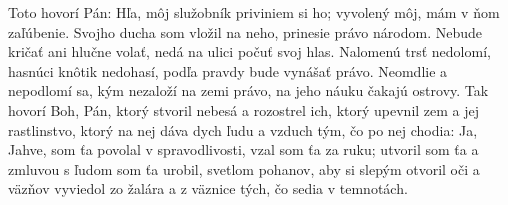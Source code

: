 Toto hovorí Pán: 
Hľa, môj služobník priviniem si ho;
vyvolený môj, mám v ňom zaľúbenie.
Svojho ducha som vložil na neho,
prinesie právo národom.
Nebude kričať ani hlučne volať,
nedá na ulici počuť svoj hlas.
Nalomenú trsť nedolomí,
hasnúci knôtik nedohasí,
podľa pravdy bude vynášať právo.
Neomdlie a nepodlomí sa,
kým nezaloží na zemi právo,
na jeho náuku čakajú ostrovy.
Tak hovorí Boh, Pán,
ktorý stvoril nebesá a rozostrel ich,
ktorý upevnil zem a jej rastlinstvo,
ktorý na nej dáva dych ľudu
a vzduch tým, čo po nej chodia:
Ja, Jahve, som ťa povolal v spravodlivosti,
vzal som ťa za ruku;
utvoril som ťa a zmluvou s ľudom som ťa urobil, svetlom pohanov,
aby si slepým otvoril oči
a väzňov vyviedol zo žalára
a z väznice tých, čo sedia v temnotách.